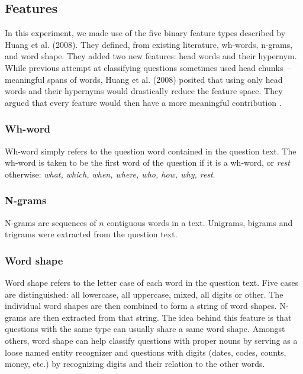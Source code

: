 \documentclass[11pt]{article}
\begin{document}
\subsection{Features}

In this experiment, we made use of the five binary feature types described by Huang et al. (2008). They defined, from existing literature, wh-words, n-grams, and word shape. They added two new features: head words and their hypernym. While previous attempt at classifying questions sometimes used head chunks -- meaningful spans of words, Huang et al. (2008) posited that using only head words and their hypernyms would drastically reduce the feature space. They argued that every feature would then have a more meaningful contribution \cite{huang}.

\subsubsection{Wh-word} Wh-word simply refers to the question word contained in the question text. The wh-word is taken to be the first word of the question if it is a wh-word, or \textit{rest} otherwise: \textit{what, which, when, where, who, how, why, rest}.

\subsubsection{N-grams} N-grams are sequences of $n$ contiguous words in a text. Unigrams, bigrams and trigrams were extracted from the question text.

\subsubsection{Word shape} Word shape refers to the letter case of each word in the question text. Five cases are distinguished: all lowercase, all uppercase, mixed, all digits or other. The individual word shapes are then combined to form a string of word shapes. N-grams are then extracted from that string. The idea behind this feature is that questions with the same type can usually share a same word shape. Amongst others, word shape can help classify questions with proper nouns by serving as a loose named entity recognizer and questions with digits (dates, codes, counts, money, etc.) by recognizing digits and their relation to the other words.
\end{document}
